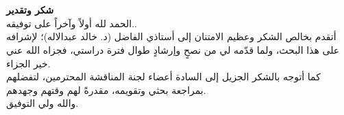 \chapter*{}
\vfill
\begin{center}
	\amirifont\large
	\textbf{شكر وتقدير}\\[10pt]
	الحمد لله أولاً وآخراً على توفيقه..\\
	أتقدم بخالص الشكر وعظيم الامتنان إلى أستاذي الفاضل (د. خالد عبدالاله)؛ لإشرافه على هذا البحث، ولما قدّمه لي من نصحٍ وإرشادٍ طوال فترة دراستي، فجزاه الله عني خير الجزاء.\\
	كما أتوجه بالشكر الجزيل إلى السادة أعضاء لجنة المناقشة المحترمين، لتفضلهم بمراجعة بحثي وتقويمه، مقدرةً لهم وقتهم وجهدهم.\\
	والله ولي التوفيق.
\end{center}
\vfill
